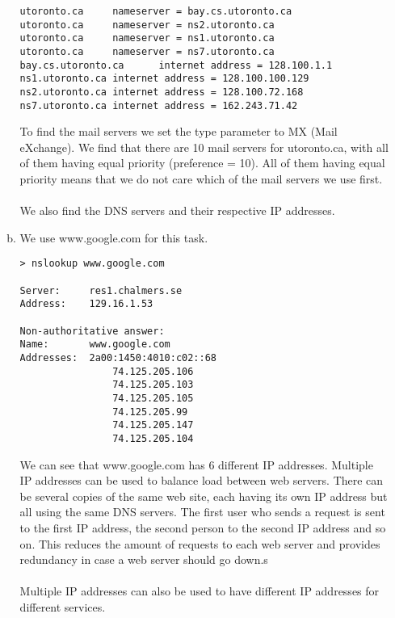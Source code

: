 \documentclass[a4paper,9pt,fleqn]{article}
\begin{document}
\begin{enumerate}[{Task} 1]
\begin{enumerate}[a)]
\begin{lstlisting}
utoronto.ca     nameserver = bay.cs.utoronto.ca
utoronto.ca     nameserver = ns2.utoronto.ca
utoronto.ca     nameserver = ns1.utoronto.ca
utoronto.ca     nameserver = ns7.utoronto.ca
bay.cs.utoronto.ca      internet address = 128.100.1.1
ns1.utoronto.ca internet address = 128.100.100.129
ns2.utoronto.ca internet address = 128.100.72.168
ns7.utoronto.ca internet address = 162.243.71.42
\end{lstlisting}

To find the mail servers we set the type parameter to {\outp MX} (Mail eXchange).
We find that there are 10 mail servers for {\outp utoronto.ca}, with all of them
having equal priority (preference = 10). All of them having equal priority
means that we do not care which of the mail servers we use first. 
\\
\\
We also find the DNS servers and their respective IP addresses. 
\item 
We use {\outp www.google.com} for this task.

\begin{lstlisting}
> nslookup www.google.com

Server:  	res1.chalmers.se
Address:  	129.16.1.53

Non-authoritative answer:
Name:    	www.google.com
Addresses:  2a00:1450:4010:c02::68
         		74.125.205.106
         		74.125.205.103
         		74.125.205.105
         		74.125.205.99
         		74.125.205.147
         		74.125.205.104
\end{lstlisting}

We can see that www.google.com has 6 different IP addresses. Multiple IP addresses
can be used to balance load between web servers. There can be several copies of the
same web site, each having its own IP address but all using the same DNS servers. The
first user who sends a request is sent to the first IP address, the second person to
the second IP address and so on. This reduces the amount of requests to each web server
and provides redundancy in case a web server should go down.s
\\
\\
Multiple IP addresses can also be used to have different IP addresses for different services.
\end{enumerate}


\end{enumerate}
\end{document}
